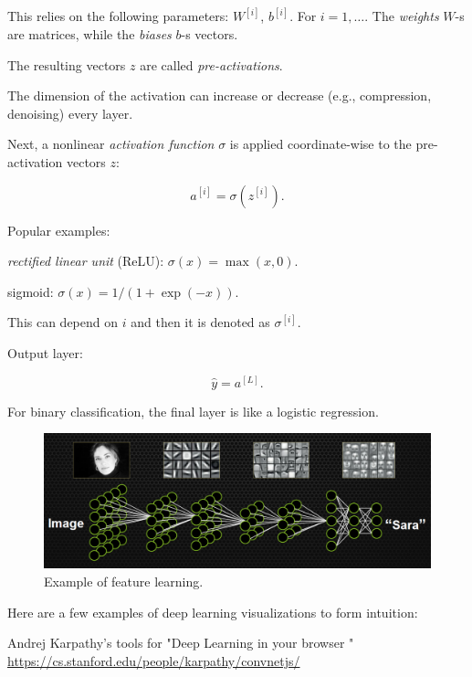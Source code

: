 \documentclass[english]{article}
\begin{document}
This relies on the following parameters: $W^{[i]}$, $b^{[i]}$. For $i=1,\ldots$. The \emph{weights} $W$-s are matrices, while the \emph{biases} $b$-s vectors.

The resulting vectors $z$ are called \emph{pre-activations}.

The dimension of the activation can increase or decrease (e.g., compression, denoising) every layer. 

\item 
Next, a nonlinear \emph{activation function} $\sigma$ is applied coordinate-wise to the pre-activation vectors $z$: 

$$a^{[i]} = \sigma(z^{[i]}).$$


Popular examples: 

\bitem 
\item \emph{rectified linear unit} (ReLU): $\sigma(x) = \max(x,0)$. 
\item sigmoid: $\sigma(x) = 1/(1+\exp(-x))$. 
\eitem 

This can depend on $i$ and then it is denoted as $\sigma^{[i]}$. 


\item Output layer: 

$$\hat y = a^{[L]}.$$

For binary classification, the final layer is like a logistic regression. 

\eenum 


\eenum 


\begin{figure}
  \centering
  \includegraphics[scale=0.3]{nn_example.png}
  \caption{Example of feature learning.}
  \label{fl}
\end{figure}

\item Here are a few examples of deep learning visualizations to form intuition: 

Andrej Karpathy's tools for "Deep Learning in your browser
" \url{https://cs.stanford.edu/people/karpathy/convnetjs/}
\end{document}

